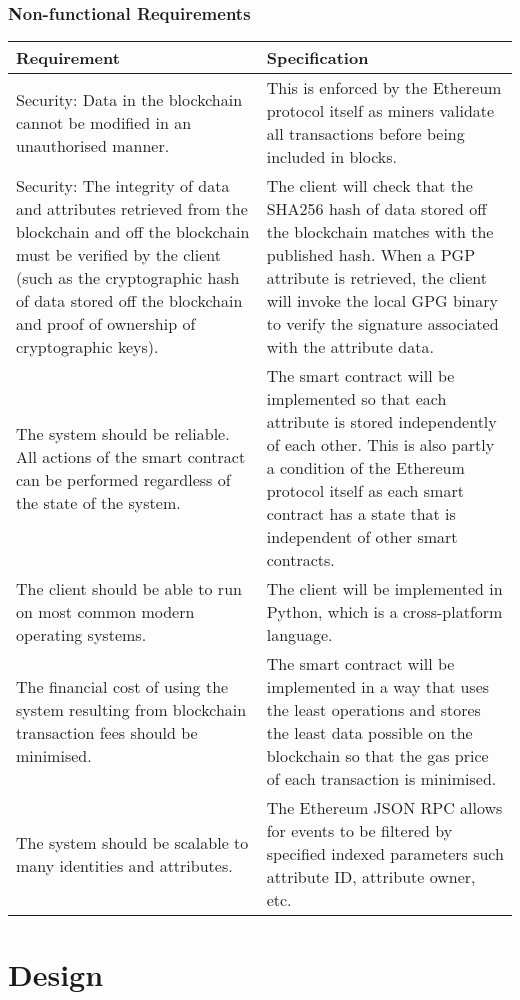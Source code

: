 \documentclass[12pt]{report}
\begin{document}
	\subsection{Non-functional Requirements}	
	\begin{longtable}{|p{6cm}|p{6cm}|}
		\hline
		\textbf{Requirement} & \textbf{Specification} \\ \hline
		Security: Data in the blockchain cannot be modified in an unauthorised manner. & This is enforced by the Ethereum protocol itself as miners validate all transactions before being included in blocks. \\ \hline
		Security: The integrity of data and attributes retrieved from the blockchain and off the blockchain must be verified by the client (such as the cryptographic hash of data stored off the blockchain and proof of ownership of cryptographic keys). & The client will check that the SHA256 hash of data stored off the blockchain matches with the published hash. When a PGP attribute is retrieved, the client will invoke the local GPG binary to verify the signature associated with the attribute data. \\ \hline
		The system should be reliable. All actions of the smart contract can be performed regardless of the state of the system. & The smart contract will be implemented so that each attribute is stored independently of each other. This is also partly a condition of the Ethereum protocol itself as each smart contract has a state that is independent of other smart contracts. \\ \hline
		The client should be able to run on most common modern operating systems. & The client will be implemented in Python, which is a cross-platform language. \\ \hline
		The financial cost of using the system resulting from blockchain transaction fees should be minimised. & The smart contract will be implemented in a way that uses the least operations and stores the least data possible on the blockchain so that the gas price of each transaction is minimised. \\ \hline
		The system should be scalable to many identities and attributes. & The Ethereum JSON RPC allows for events to be filtered by specified indexed parameters such attribute ID, attribute owner, etc. \\ \hline
	\end{longtable}
	
	\chapter{Design}
\end{document}
